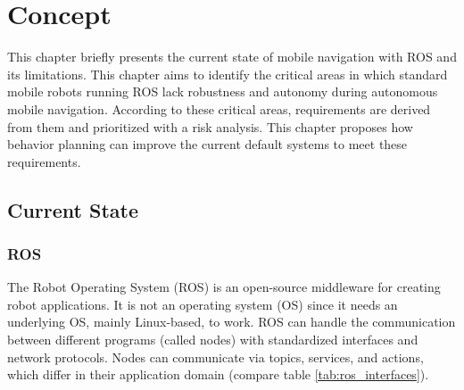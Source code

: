 \chapter{Concept}
\label{cha:methoden}

This chapter briefly presents the current state of mobile navigation with ROS and its limitations. This chapter aims to identify the critical areas in which standard mobile robots running ROS lack robustness and autonomy during autonomous mobile navigation. According to these critical areas, requirements are derived from them and prioritized with a risk analysis. 
This chapter proposes how behavior planning can improve the current default systems to meet these requirements. 

\section{Current State}
\label{sec:Current State}

\subsection{ROS}
The Robot Operating System (ROS) is an open-source middleware for creating robot applications. It is not an operating system (OS) since it needs an underlying OS, mainly Linux-based, to work. ROS can handle the communication between different programs (called nodes) with standardized interfaces and network protocols. Nodes can communicate via topics, services, and actions, which differ in their application domain (compare table \ref{tab:ros_interfaces}). 

\begin{table}[ht]
	\centering
	\caption{ROS Communication Options}
	\label{tab:ros_interfaces}
	\renewcommand{\arraystretch}{1.5}
\end{table}

